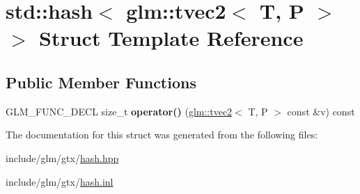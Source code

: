 \hypertarget{structstd_1_1hash_3_01glm_1_1tvec2_3_01T_00_01P_01_4_01_4}{}\section{std\+:\+:hash$<$ glm\+:\+:tvec2$<$ T, P $>$ $>$ Struct Template Reference}
\label{structstd_1_1hash_3_01glm_1_1tvec2_3_01T_00_01P_01_4_01_4}
\subsection*{Public Member Functions}
\begin{DoxyCompactItemize}
\item 
\mbox{\label{structstd_1_1hash_3_01glm_1_1tvec2_3_01T_00_01P_01_4_01_4_a75e9bfbaf3db72556cd656f734767175}} 
G\+L\+M\+\_\+\+F\+U\+N\+C\+\_\+\+D\+E\+CL size\+\_\+t {\bfseries operator()} (\hyperlink{structglm_1_1tvec2}{glm\+::tvec2}$<$ T, P $>$ const \&v) const
\end{DoxyCompactItemize}


The documentation for this struct was generated from the following files\+:\begin{DoxyCompactItemize}
\item 
include/glm/gtx/\hyperlink{hash_8hpp}{hash.\+hpp}\item 
include/glm/gtx/\hyperlink{hash_8inl}{hash.\+inl}\end{DoxyCompactItemize}
